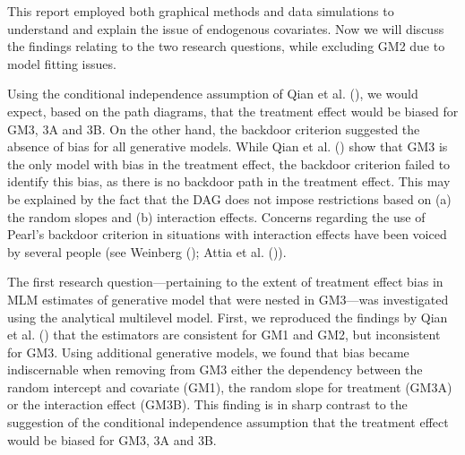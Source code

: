\documentclass[
  12pt,
  a4paper,
]{article}
\begin{document}
This report employed both graphical methods and data simulations to
understand and explain the issue of endogenous covariates. Now we will
discuss the findings relating to the two research questions, while
excluding GM2 due to model fitting issues.

Using the conditional independence assumption of Qian et al.
(), we would expect, based on the path
diagrams, that the treatment effect would be biased for GM3, 3A and 3B.
On the other hand, the backdoor criterion suggested the absence of bias
for all generative models. While Qian et al.
() show that GM3 is the only model with
bias in the treatment effect, the backdoor criterion failed to identify
this bias, as there is no backdoor path in the treatment effect. This
may be explained by the fact that the DAG does not impose restrictions
based on (a) the random slopes and (b) interaction effects. Concerns
regarding the use of Pearl's backdoor criterion in situations with
interaction effects have been voiced by several people (see Weinberg
(); Attia et al.
()).

The first research question---pertaining to the extent of treatment
effect bias in MLM estimates of generative model that were nested in
GM3---was investigated using the analytical multilevel model. First, we
reproduced the findings by Qian et al. ()
that the estimators are consistent for GM1 and GM2, but inconsistent for
GM3. Using additional generative models, we found that bias became
indiscernable when removing from GM3 either the dependency between the
random intercept and covariate (GM1), the random slope for treatment
(GM3A) or the interaction effect (GM3B). This finding is in sharp
contrast to the suggestion of the conditional independence assumption
that the treatment effect would be biased for GM3, 3A and 3B.
\end{document}

